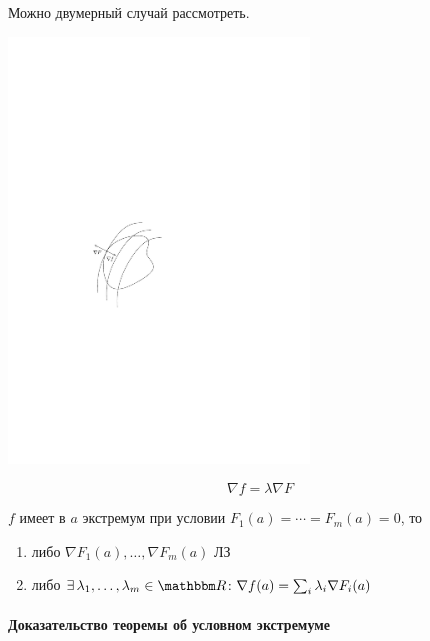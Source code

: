 \documentclass[12pt,timbord]{../../../notes}
\begin{document}
\begin{exmp*}
  Можно двумерный случай рассмотреть.
  
  \begin{minipage}{0.48\linewidth}
    \vspace{1em}
    \noindent\includegraphics[width=0.6\textwidth]{condextr2d}
  \end{minipage} \hfill
  \begin{minipage}{0.48\linewidth}
    \[\nabla f = \lambda \nabla F\]
\begin{cor}
  $f$ имеет в $a$ экстремум при условии $F_1(a) = \cdots = F_m(a) = 0$, то
  \begin{enumerate}
    \item либо $\nabla F_1(a), \dotsc, \nabla F_m(a)$ ЛЗ
    \item либо $\exists\, \lambda_1, \dotsc, \lambda_m \in \R \colon \nabla f(a) =
      \sum_i \lambda_i \nabla F_i(a)$ 
  \end{enumerate}
\end{cor}
  \end{minipage}
\end{exmp*}


\paragraph{Доказательство теоремы об условном экстремуме}
\label{par:diffspace::condextrema} 
\end{document}
